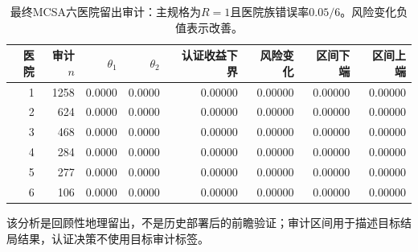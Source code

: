 \begin{table}[ht]
\centering\scriptsize
\caption{最终MCSA六医院留出审计：主规格为$R=1$且医院族错误率$0.05/6$。风险变化负值表示改善。}
\label{tab:elaia-final}
\begin{tabular}{rrrrrrrr}
\toprule
医院 & 审计$n$ & $\theta_1$ & $\theta_2$ & 认证收益下界 & 风险变化 & 区间下端 & 区间上端\\
\midrule
1 & 1258 & 0.0000 & 0.0000 & 0.00000 & 0.00000 & 0.00000 & 0.00000\\
2 & 624 & 0.0000 & 0.0000 & 0.00000 & 0.00000 & 0.00000 & 0.00000\\
3 & 468 & 0.0000 & 0.0000 & 0.00000 & 0.00000 & 0.00000 & 0.00000\\
4 & 284 & 0.0000 & 0.0000 & 0.00000 & 0.00000 & 0.00000 & 0.00000\\
5 & 277 & 0.0000 & 0.0000 & 0.00000 & 0.00000 & 0.00000 & 0.00000\\
6 & 106 & 0.0000 & 0.0000 & 0.00000 & 0.00000 & 0.00000 & 0.00000\\
\bottomrule
\end{tabular}
\begin{minipage}{0.95\textwidth}\footnotesize 该分析是回顾性地理留出，不是历史部署后的前瞻验证；审计区间用于描述目标结局结果，认证决策不使用目标审计标签。\end{minipage}
\end{table}